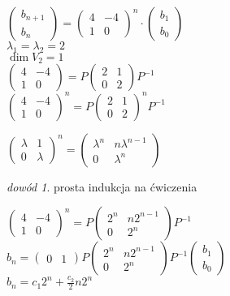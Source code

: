 \documentclass[10pt]{article}
\theoremstyle{definition}
\theoremstyle{definition}
\theoremstyle{definition}
\theoremstyle{definition}
\theoremstyle{remark}
\newtheorem*{dd}{dowód}
\theoremstyle{definition}
\theoremstyle{definition}
\theoremstyle{definition}
\theoremstyle{definition}
\theoremstyle{definition}
\begin{document}
$\begin{pmatrix} 
    b_{n+1} \\ b_n
    \end{pmatrix} = \begin{pmatrix} 4 & -4 \\ 1 & 0 \end{pmatrix}^n \cdot \begin{pmatrix} b_1 \\ b_0
    \end{pmatrix}$ \\ 
$\lambda_1 = \lambda_2 = 2$\\ 
$ \dim V_2 = 1$ \\ 
$\begin{pmatrix} 4 & -4 \\ 1 & 0 \end{pmatrix} = P \begin{pmatrix} 2 & 1 \\ 0 & 2 \end{pmatrix} P^{-1}$ \\ 
$\begin{pmatrix} 4 & -4 \\ 1 & 0 \end{pmatrix}^n = P \begin{pmatrix} 2 & 1 \\ 0 & 2 \end{pmatrix}^n P^{-1}$ 
\begin{lem}
    $ \begin{pmatrix} \lambda & 1 \\ 0 & \lambda \end{pmatrix}^n = \begin{pmatrix} \lambda^n & n\lambda^{n-1} \\ 
    0 & \lambda^n \end{pmatrix}$ 
\begin{dd} 
    prosta indukcja na ćwiczenia
\end{dd} 
\end{lem} 
$\begin{pmatrix} 4 & -4 \\ 1 & 0 \end{pmatrix}^n = P \begin{pmatrix} 2^n & n2^{n-1} \\ 0 & 2^n 
\end{pmatrix} P^{-1}$ \\ 
$b_n = \begin{pmatrix} 0 & 1 \end{pmatrix} P \begin{pmatrix} 2^n & n2^{n-1} \\ 0 & 2^n \end{pmatrix} P^{-1} 
\begin{pmatrix} b_1 \\ b_0 \end{pmatrix}$ \\ 
$b_n = c_1 2^n + \frac{c_2}{2} n 2^n$
\end{document}
